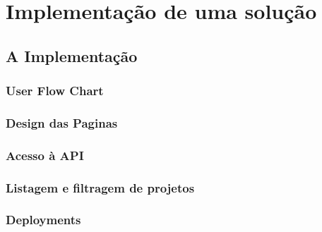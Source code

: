 \chapter{Implementação de uma solução}

\section{A Implementação}

\subsection{User Flow Chart}

\subsection{Design das Paginas}

\subsection{Acesso à API}

\subsection{Listagem e filtragem de projetos}

\subsection{Deployments}

